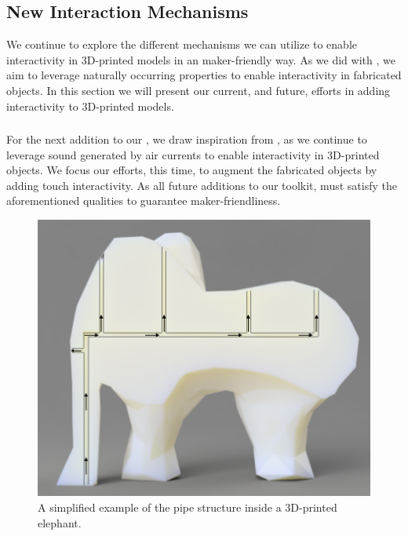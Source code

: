     \subsection{New Interaction Mechanisms}
      We continue to explore the different mechanisms we can utilize to enable
      interactivity in 3D-printed models in an maker-friendly way. As we did
      with \bh, we aim to leverage naturally occurring properties to
      enable interactivity in fabricated objects. In this section we will
      present our current, and future, efforts in adding interactivity to 3D-printed models.
      
      \subsubsection{\at}
        For the next addition to our \itoolkit, we draw inspiration
        from \bh, as we continue to leverage sound generated by air
        currents to enable interactivity in 3D-printed objects. We focus our
        efforts, this time, to augment the fabricated objects by adding touch
        interactivity. As all future additions to our toolkit, \at must
        satisfy the aforementioned qualities to guarantee
        maker-friendliness.
        
        \begin{figure}
          \centering
            \includegraphics[width=.9\columnwidth]{figures/elephant-airtouch.png}
            \caption{A simplified example of the pipe structure inside a
            3D-printed elephant.}
            \label{fig:elephant-airtouch}
        \end{figure}
        
